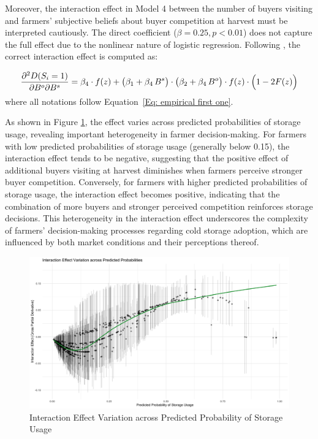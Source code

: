 Moreover, the interaction effect in Model 4 between the number of buyers visiting and farmers' subjective beliefs about buyer competition at harvest must be interpreted cautiously. The direct coefficient ($\beta = 0.25, p<0.01$) does not capture the full effect due to the nonlinear nature of logistic regression. Following \cite{ai2003interaction}, the correct interaction effect is computed as:

\begin{equation}
\frac{\partial^2 D(S_i=1)}{\partial B^o \partial B^s} = \beta_{4} \cdot f(z) + \bigl(\beta_1 + \beta_{4} \, B^s\bigr) \cdot \bigl(\beta_2 + \beta_{4} \, B^o\bigr) \cdot f(z) \cdot \Bigl(1 - 2F(z)\Bigr)
\end{equation}
\noindent where all notations follow Equation~\ref{Eq: empirical first one}.

As shown in Figure \ref{Figure: interaction effects}, the effect varies across predicted probabilities of storage usage, revealing important heterogeneity in farmer decision-making. For farmers with low predicted probabilities of storage usage (generally below 0.15), the interaction effect tends to be negative, suggesting that the positive effect of additional buyers visiting at harvest diminishes when farmers perceive stronger buyer competition. Conversely, for farmers with higher predicted probabilities of storage usage, the interaction effect becomes positive, indicating that the combination of more buyers and stronger perceived competition reinforces storage decisions. This heterogeneity in the interaction effect underscores the complexity of farmers' decision-making processes regarding cold storage adoption, which are influenced by both market conditions and their perceptions thereof.

\begin{figure}[ht]
\centering
\includegraphics[width=1\textwidth]{figures/Interaction_Effect_across_Predicted Probabilities.png}
\caption{Interaction Effect Variation across Predicted Probability of Storage Usage}
\label{Figure: interaction effects}
\end{figure}



